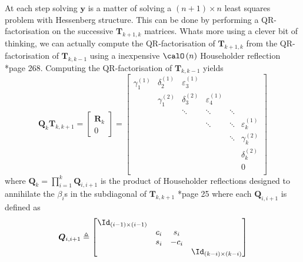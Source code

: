 At each step solving $\bm{y}$ is a matter of solving a $(n+1) \times n$ least squares problem with Hessenberg structure. This can be done by performing a QR-factorisation on the successive $\bm{T}_{k+1,k}$ matrices. Whats more using a clever bit of thinking, we can actually compute the QR-factorisation of $\bm{T}_{k+1,k}$ from the QR-factorisation of $\bm{T}_{k,k-1}$ using a inexpensive $\calO \left( n \right)$ Householder reflection \cite{TrefethenLloydN.LloydNicholas1997Nla/}*{page 268}. Computing the QR-factorisation of $\bm{T}_{k,k-1}$ yields
\begin{equation}
    \bm{Q}_k \bm{T}_{k,k+1}
    =
    \begin{bmatrix}
        \bm{R}_k \\ 0
    \end{bmatrix}
    =
    \begin{bmatrix}
        \gamma_{1}^{(1)} & \delta_{2}^{(1)} & \varepsilon_{3}^{(1)} &                       &        &                       \\
                         & \gamma_{1}^{(2)} & \delta_{3}^{(2)}      & \varepsilon_{4}^{(1)} &        &                       \\
                         &                  & \ddots                & \ddots                & \ddots &                       \\
                         &                  &                       & \ddots                & \ddots & \varepsilon_{k}^{(1)} \\
                         &                  &                       &                       & \ddots & \gamma_{k}^{(2)}      \\
                         &                  &                       &                       &        & \delta_{k}^{(2)}      \\
                         &                  &                       &                       &        & 0                     \\
    \end{bmatrix}
\end{equation}
where $\bm{Q}_k = \prod_{i=1}^{k} \bm{Q}_{i,i+1}$ is the product of Householder reflections designed to annihilate the $\beta_i$s in the subdiagonal of $\bm{T}_{k,k+1}$ \cite{ChoiSou-ChengTerrya2007Imfs}*{page 25} where each $\bm{Q}_{i,i+1}$ is defined as
\begin{equation*}
    \bm{Q}_{i,i+1} \triangleq
    \begin{bmatrix}
        \Id_{(i-1) \times (i-1)} &       &        &                          \\
                                 & c_{i} & s_{i}  &                          \\
                                 & s_{i} & -c_{i} &                          \\
                                 &       &        & \Id_{(k-i) \times (k-i)}
    \end{bmatrix}
\end{equation*}
